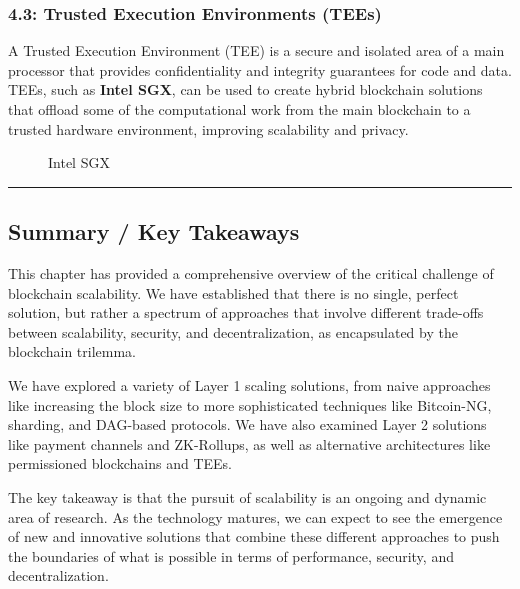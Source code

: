 \subsubsection{4.3: Trusted Execution Environments
(TEEs)}\label{trusted-execution-environments-tees}

A Trusted Execution Environment (TEE) is a secure and isolated area of a
main processor that provides confidentiality and integrity guarantees
for code and data. TEEs, such as \textbf{Intel SGX}, can be used to
create hybrid blockchain solutions that offload some of the
computational work from the main blockchain to a trusted hardware
environment, improving scalability and privacy.

\begin{figure}
\centering
\caption{Intel SGX}
\end{figure}

\begin{center}\rule{0.5\linewidth}{0.5pt}\end{center}

\subsection{Summary / Key Takeaways}\label{summary-key-takeaways}

This chapter has provided a comprehensive overview of the critical
challenge of blockchain scalability. We have established that there is
no single, perfect solution, but rather a spectrum of approaches that
involve different trade-offs between scalability, security, and
decentralization, as encapsulated by the blockchain trilemma.

We have explored a variety of Layer 1 scaling solutions, from naive
approaches like increasing the block size to more sophisticated
techniques like Bitcoin-NG, sharding, and DAG-based protocols. We have
also examined Layer 2 solutions like payment channels and ZK-Rollups, as
well as alternative architectures like permissioned blockchains and
TEEs.

The key takeaway is that the pursuit of scalability is an ongoing and
dynamic area of research. As the technology matures, we can expect to
see the emergence of new and innovative solutions that combine these
different approaches to push the boundaries of what is possible in terms
of performance, security, and decentralization.

